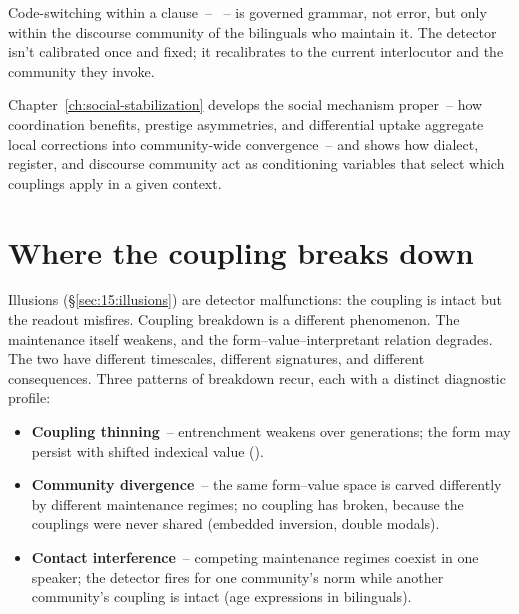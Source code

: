 Code-switching within a clause~-- ~-- is governed grammar, not error, but only within the discourse community of the bilinguals who maintain it. The detector isn't calibrated once and fixed; it recalibrates to the current interlocutor and the community they invoke.

Chapter~\ref{ch:social-stabilization} develops the social mechanism proper~-- how coordination benefits, prestige asymmetries, and differential uptake aggregate local corrections into community-wide convergence~-- and shows how dialect, register, and discourse community act as conditioning variables that select which couplings apply in a given context.


\section{Where the coupling breaks down}
\label{sec:15:breakdown}

Illusions (§\ref{sec:15:illusions}) are detector malfunctions: the coupling is intact but the readout misfires. Coupling breakdown is a different phenomenon. The maintenance itself weakens, and the form--value--interpretant relation degrades. The two have different timescales, different signatures, and different consequences. Three patterns of breakdown recur, each with a distinct diagnostic profile:
\begin{itemize}
\item \textbf{Coupling thinning}~-- entrenchment weakens over generations; the form may persist with shifted indexical value ().
\item \textbf{Community divergence}~-- the same form--value space is carved differently by different maintenance regimes; no coupling has broken, because the couplings were never shared (embedded inversion, double modals).
\item \textbf{Contact interference}~-- competing maintenance regimes coexist in one speaker; the detector fires for one community's norm while another community's coupling is intact (age expressions in bilinguals).
\end{itemize}

